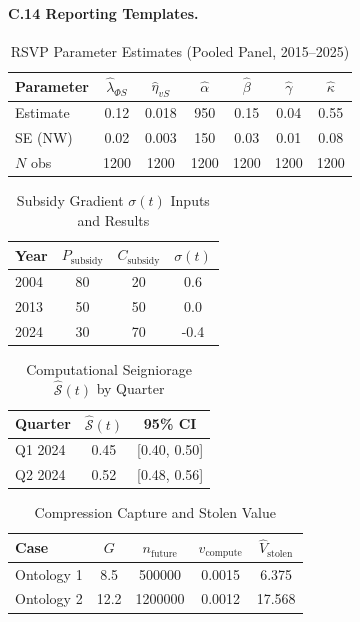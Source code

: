\documentclass[12pt]{article}
\begin{document}
\paragraph{C.14 Reporting Templates.}

\begin{table}[h]
\caption{RSVP Parameter Estimates (Pooled Panel, 2015–2025)}
\centering
\begin{tabular}{lcccccc}
\toprule
Parameter & \(\widehat{\lambda}_{\Phi S}\) & \(\widehat{\eta}_{vS}\) & \(\widehat{\alpha}\) & \(\widehat{\beta}\) & \(\widehat{\gamma}\) & \(\widehat{\kappa}\) \\
\midrule
Estimate  & 0.12 & 0.018 & 950 & 0.15 & 0.04 & 0.55 \\
SE (NW)   & 0.02 & 0.003 & 150 & 0.03 & 0.01 & 0.08 \\
\(N\) obs   & 1200 & 1200 & 1200 & 1200 & 1200 & 1200 \\
\bottomrule
\end{tabular}
\end{table}

\begin{table}[h]
\caption{Subsidy Gradient \(\sigma(t)\) Inputs and Results}
\centering
\begin{tabular}{lccc}
\toprule
Year & \(P_{\text{subsidy}}\) & \(C_{\text{subsidy}}\) & \(\sigma(t)\) \\
\midrule
2004 & 80 & 20 & 0.6 \\
2013 & 50 & 50 & 0.0 \\
2024 & 30 & 70 & -0.4 \\
\bottomrule
\end{tabular}
\end{table}

\begin{table}[h]
\caption{Computational Seigniorage \(\widehat{\mathcal{S}}(t)\) by Quarter}
\centering
\begin{tabular}{lcc}
\toprule
Quarter & \(\widehat{\mathcal{S}}(t)\) & 95\% CI \\
\midrule
Q1 2024 & 0.45 & [0.40, 0.50] \\
Q2 2024 & 0.52 & [0.48, 0.56] \\
\bottomrule
\end{tabular}
\end{table}

\begin{table}[h]
\caption{Compression Capture and Stolen Value}
\centering
\begin{tabular}{lcccc}
\toprule
Case & \(G\) & \(n_{\text{future}}\) & \(v_{\text{compute}}\) & \(\widehat{V}_{\text{stolen}}\) \\
\midrule
Ontology 1 & 8.5 & 500000 & 0.0015 & 6.375 \\
Ontology 2 & 12.2 & 1200000 & 0.0012 & 17.568 \\
\bottomrule
\end{tabular}
\end{table}
\end{document}
